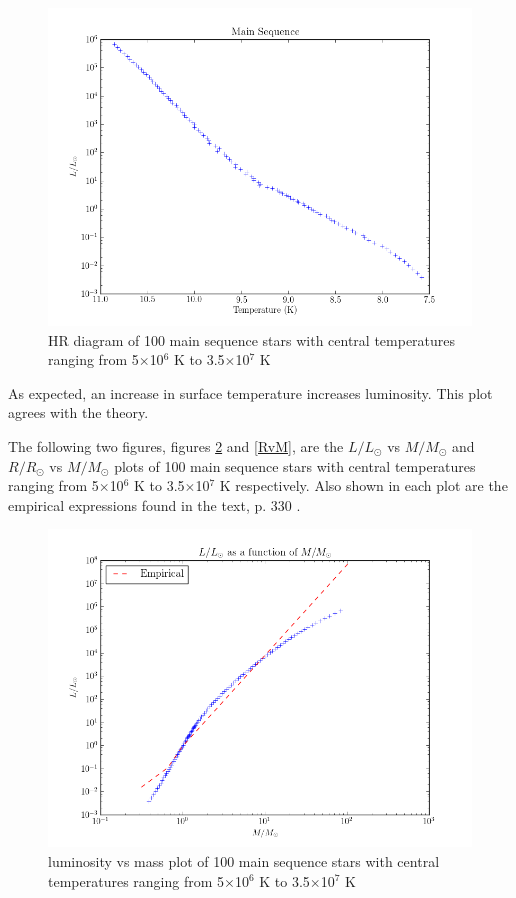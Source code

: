 \documentclass[11pt]{article}
\begin{document}
\begin{figure}[h!]
\centering
\includegraphics[scale=0.7]{plots/main_sequence/ms.png}
\caption{HR diagram of 100 main sequence stars with central temperatures ranging from 5$\times$10$^6$ K to 3.5$\times$10$^7$ K}
\label{ms}
\end{figure}

As expected, an increase in surface temperature increases luminosity. This plot agrees with the theory. 

The following two figures, figures \ref{LvM} and \ref{RvM}, are the $L/L_\odot$ vs $M/M_\odot$ and $R/R_\odot$ vs $M/M_\odot$ plots of 100 main sequence stars with central temperatures ranging from 5$\times$10$^6$ K to 3.5$\times$10$^7$ K respectively. Also shown in each plot are the empirical expressions found in the text, p. 330 \cite{text}.

\begin{figure}[h!]
\centering
\includegraphics[scale=0.6]{plots/main_sequence/LvM.png}
\caption{luminosity vs mass plot of 100 main sequence stars with central temperatures ranging from 5$\times$10$^6$ K to 3.5$\times$10$^7$ K}
\label{LvM}
\end{figure}
\end{document}
